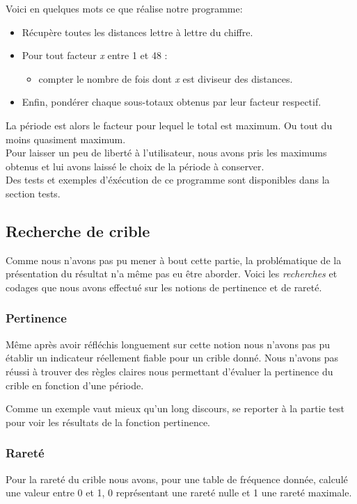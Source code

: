 \documentclass[a4paper, 11pt]{article}
\begin{document}
Voici en quelques mots ce que réalise notre programme:
\begin{itemize}
\item Récupère toutes les distances lettre à lettre du chiffre.
\item Pour tout facteur \textit{x} entre 1 et 48 :
  \begin{itemize}
  \item compter le nombre de fois dont \textit{x} est diviseur des
    distances.
  \end{itemize}
\item Enfin, pondérer chaque sous-totaux obtenus par leur facteur
  respectif.
\end{itemize}

La période est alors le facteur pour lequel le total est maximum. Ou
tout du moins quasiment maximum.\\
Pour laisser un peu de liberté à l'utilisateur, nous avons pris les
maximums obtenus et lui avons laissé le choix de la période à conserver.\\

Des tests et exemples d'éxécution de ce programme sont disponibles
dans la section tests.


\subsection{Recherche de crible}
Comme nous n'avons pas pu mener à bout cette partie, la problématique
de la présentation du résultat n'a même pas eu être aborder.
Voici les \textit{recherches} et codages que nous avons effectué sur
les notions de pertinence et de rareté.

\subsubsection{Pertinence}
Même après avoir réfléchis longuement sur cette notion nous n'avons
pas pu établir un indicateur réellement fiable pour un crible donné.
Nous n'avons pas réussi à trouver des règles claires nous permettant
d'évaluer la pertinence du crible en fonction d'une période.

Comme un exemple vaut mieux qu'un long discours, se reporter à la
partie test pour voir les résultats de la fonction pertinence.


\subsubsection{Rareté}
Pour la rareté du crible nous avons, pour une table de
fréquence donnée, calculé une valeur entre 0 et 1, 0 représentant une
rareté nulle et 1 une rareté maximale.
\end{document}
